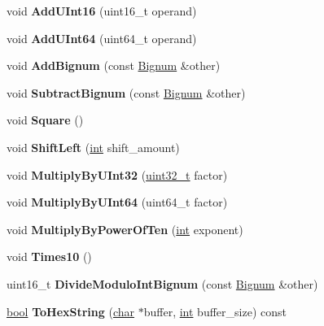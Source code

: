 \begin{DoxyCompactItemize}
void {\bfseries Add\+U\+Int16} (uint16\+\_\+t operand)
\item 
\mbox{\label{classv8_1_1internal_1_1Bignum_aade1d40c20f9c0a61aecd00c87b51559}} 
void {\bfseries Add\+U\+Int64} (uint64\+\_\+t operand)
\item 
\mbox{\label{classv8_1_1internal_1_1Bignum_a251cb303ef462c9ecf55c8fac5e77714}} 
void {\bfseries Add\+Bignum} (const \mbox{\hyperlink{classv8_1_1internal_1_1Bignum}{Bignum}} \&other)
\item 
\mbox{\label{classv8_1_1internal_1_1Bignum_a3f24980cdff9e5af960d6be7572a8c4d}} 
void {\bfseries Subtract\+Bignum} (const \mbox{\hyperlink{classv8_1_1internal_1_1Bignum}{Bignum}} \&other)
\item 
\mbox{\label{classv8_1_1internal_1_1Bignum_af42cbac59b0578bda611ae8161682b27}} 
void {\bfseries Square} ()
\item 
\mbox{\label{classv8_1_1internal_1_1Bignum_a002a34b6b5c3dc148c7dfb02acfbd0aa}} 
void {\bfseries Shift\+Left} (\mbox{\hyperlink{classint}{int}} shift\+\_\+amount)
\item 
\mbox{\label{classv8_1_1internal_1_1Bignum_ac5e3c1517936f1afbf9c8794edda4fef}} 
void {\bfseries Multiply\+By\+U\+Int32} (\mbox{\hyperlink{classuint32__t}{uint32\+\_\+t}} factor)
\item 
\mbox{\label{classv8_1_1internal_1_1Bignum_aa2b613067a91bf46aa86e1bae6cfa6b7}} 
void {\bfseries Multiply\+By\+U\+Int64} (uint64\+\_\+t factor)
\item 
\mbox{\label{classv8_1_1internal_1_1Bignum_a68a03a369b954e5911cfd3252d4fff91}} 
void {\bfseries Multiply\+By\+Power\+Of\+Ten} (\mbox{\hyperlink{classint}{int}} exponent)
\item 
\mbox{\label{classv8_1_1internal_1_1Bignum_ad3fbf70dea9eb59ebac651e99c1ecc77}} 
void {\bfseries Times10} ()
\item 
\mbox{\label{classv8_1_1internal_1_1Bignum_a7632eadb7f993623a031ba700c5d4ca1}} 
uint16\+\_\+t {\bfseries Divide\+Modulo\+Int\+Bignum} (const \mbox{\hyperlink{classv8_1_1internal_1_1Bignum}{Bignum}} \&other)
\item 
\mbox{\label{classv8_1_1internal_1_1Bignum_ae22c3d2367745ffb47f90fd7fa88779d}} 
\mbox{\hyperlink{classbool}{bool}} {\bfseries To\+Hex\+String} (\mbox{\hyperlink{classchar}{char}} $\ast$buffer, \mbox{\hyperlink{classint}{int}} buffer\+\_\+size) const
\end{DoxyCompactItemize}
